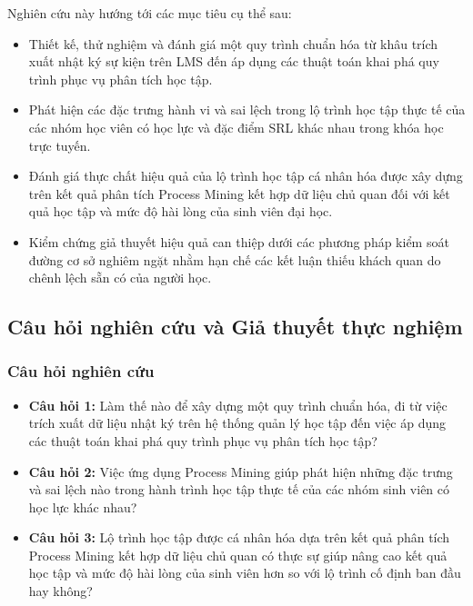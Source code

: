 Nghiên cứu này hướng tới các mục tiêu cụ thể sau:
\begin{itemize}
    \item Thiết kế, thử nghiệm và đánh giá một quy trình chuẩn hóa từ khâu trích xuất nhật ký sự kiện trên LMS đến áp dụng các thuật toán khai phá quy trình phục vụ phân tích học tập.
    \item Phát hiện các đặc trưng hành vi và sai lệch trong lộ trình học tập thực tế của các nhóm học viên có học lực và đặc điểm SRL khác nhau trong khóa học trực tuyến.
    \item Đánh giá thực chất hiệu quả của lộ trình học tập cá nhân hóa được xây dựng trên kết quả phân tích Process Mining kết hợp dữ liệu chủ quan đối với kết quả học tập và mức độ hài lòng của sinh viên đại học.
    \item Kiểm chứng giả thuyết hiệu quả can thiệp dưới các phương pháp kiểm soát đường cơ sở nghiêm ngặt nhằm hạn chế các kết luận thiếu khách quan do chênh lệch sẵn có của người học.
\end{itemize}

\subsection{Câu hỏi nghiên cứu và Giả thuyết thực nghiệm}

\subsubsection{Câu hỏi nghiên cứu}
\begin{itemize}
    \item \textbf{Câu hỏi 1:} Làm thế nào để xây dựng một quy trình chuẩn hóa, đi từ việc trích xuất dữ liệu nhật ký trên hệ thống quản lý học tập đến việc áp dụng các thuật toán khai phá quy trình phục vụ phân tích học tập?
    \item \textbf{Câu hỏi 2:} Việc ứng dụng Process Mining giúp phát hiện những đặc trưng và sai lệch nào trong hành trình học tập thực tế của các nhóm sinh viên có học lực khác nhau?
    \item \textbf{Câu hỏi 3:} Lộ trình học tập được cá nhân hóa dựa trên kết quả phân tích Process Mining kết hợp dữ liệu chủ quan có thực sự giúp nâng cao kết quả học tập và mức độ hài lòng của sinh viên hơn so với lộ trình cố định ban đầu hay không?
\end{itemize}

